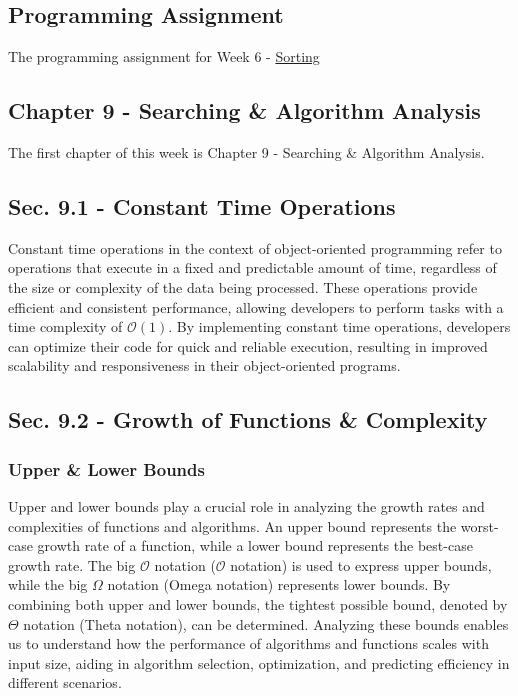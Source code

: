 \subsection{Programming Assignment}

The programming assignment for Week 6 - \href{https://github.com/cu-cspb-2270-Summer-2023/pa4-RelativiBit}{Sorting}

\subsection{Chapter 9 - Searching \& Algorithm Analysis}

The first chapter of this week is Chapter 9 - Searching \& Algorithm Analysis.

\subsection*{Sec. 9.1 - Constant Time Operations}

Constant time operations in the context of object-oriented programming refer to operations that execute in a fixed and predictable amount of time, regardless of the size or complexity of the data being processed. These operations provide efficient and consistent performance, allowing developers to perform tasks with a time complexity of $\mathcal{O}(1)$. 
By implementing constant time operations, developers can optimize their code for quick and reliable execution, resulting in improved scalability and responsiveness in their object-oriented programs.

\subsection*{Sec. 9.2 - Growth of Functions \& Complexity}

\subsubsection{Upper \& Lower Bounds}

Upper and lower bounds play a crucial role in analyzing the growth rates and complexities of functions and algorithms. An upper bound represents the worst-case growth rate of a function, while a lower bound represents the best-case growth rate. The big $\mathcal{O}$ notation ($\mathcal{O}$ notation) is used to express upper bounds, while the big $\Omega$ notation (Omega notation) represents 
lower bounds. By combining both upper and lower bounds, the tightest possible bound, denoted by $\Theta$ notation (Theta notation), can be determined. Analyzing these bounds enables us to understand how the performance of algorithms and functions scales with input size, aiding in algorithm selection, optimization, and predicting efficiency in different scenarios.

